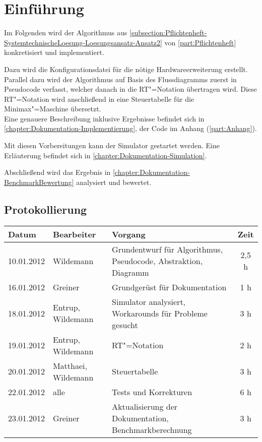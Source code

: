 \chapter{Einführung}
\label{chapter:Dokumentation-Einfuehrung}

Im Folgenden wird der Algorithmus aus \autoref{subsection:Pflichtenheft-SystemtechnischeLoesung-Loesungsansatz-Ansatz2} von \autoref{part:Pflichtenheft} konkretisiert und implementiert.

Dazu wird die Konfigurationsdatei für die nötige Hardwareerweiterung erstellt. Parallel dazu wird der Algorithmus auf Basis des Flussdiagramms zuerst in Pseudocode verfasst, welcher danach in die RT"=Notation übertragen wird. Diese RT"=Notation wird anschließend in eine Steuertabelle für die Minimax"=Maschine übersetzt.\\
Eine genauere Beschreibung inklusive Ergebnisse befindet sich in \autoref{chapter:Dokumentation-Implementierung}, der Code im Anhang (\autoref{part:Anhang}).

Mit diesen Vorbereitungen kann der Simulator gestartet werden. Eine Erläuterung befindet sich in \autoref{chapter:Dokumentation-Simulation}.

Abschließend wird das Ergebnis in \autoref{chapter:Dokumentation-BenchmarkBewertung} analysiert und bewertet.


\section{Protokollierung}
\label{section:Dokumentation-Einfuehrung-Protokollierung}

\begin{tabularx}{\textwidth}{|l|l|X|c|}
    \hline
    Datum & Bearbeiter & Vorgang & Zeit \\
    \hline
    \hline
    10.01.2012 & Wildemann & Grundentwurf für Algorithmus, Pseudocode, Abstraktion, Diagramm & 2,5 h \\
    \hline
    16.01.2012 & Greiner & Grundgerüst für Dokumentation & 1 h \\
    \hline
    18.01.2012 & Entrup, Wildemann & Simulator analysiert, Workarounds für Probleme gesucht & 3 h \\
    \hline
    19.01.2012 & Entrup, Wildemann & RT"=Notation & 2 h\\
    \hline
    20.01.2012 & Matthaei, Wildemann & Steuertabelle & 3 h\\
    \hline
    22.01.2012 & alle & Tests und Korrekturen & 6 h\\
    \hline
    23.01.2012 & Greiner & Aktualisierung der Dokumentation, Benchmarkberechnung & 3 h \\
    \hline
\end{tabularx}
